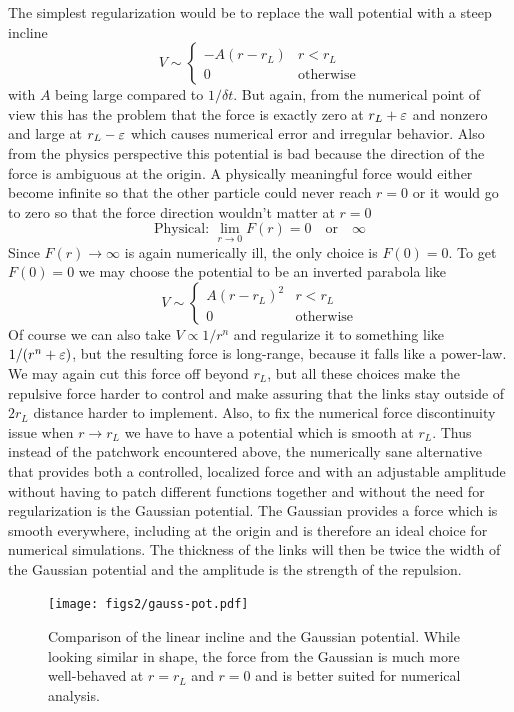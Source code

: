 \documentclass[nofootinbib,preprint,floatfix,titlepage,superscriptaddress]{revtex4} %
\begin{document}
The simplest regularization would be to replace the wall potential with a steep incline
\[V \sim \begin{cases} -A(r -r_L) & r< r_L \\
0 & \mbox{otherwise} 
\end{cases}\]
with $A$ being large compared to $1/\delta t$. 
But again, from the numerical point of view this has the problem that the force is exactly zero at $r_L+\varepsilon$ and nonzero and large at $r_L - \varepsilon$ which causes numerical error and irregular behavior. Also from the physics perspective this potential is bad because the direction of the force is ambiguous at the origin. A physically meaningful force would either become infinite so that the other particle could never reach $r=0$ or it would go to zero so that the force direction wouldn't matter at $r=0$
\[\mbox{Physical: } \lim_{r\to 0} F(r) = 0 \quad \mbox{or}\quad \infty \]
Since $F(r)\to \infty$ is again numerically ill, the only choice is $F(0) = 0$. To get $F(0) = 0$ we may choose the potential to be an inverted parabola like
\[V \sim \begin{cases} A(r -r_L)^2 & r< r_L \\
0 & \mbox{otherwise} 
\end{cases}\]
Of course we can also take $V\propto 1/r^n$ 
and regularize it to something like $1/(r^n+\varepsilon)$, but the resulting force is long-range, because it falls like a power-law. We may again cut this force off beyond $r_L$, but all these choices make the repulsive force harder to control and make assuring that the links stay outside of $2r_L$ distance harder to implement. 
Also, to fix the numerical force discontinuity issue when $r\to r_L$ we have to have a potential which is smooth at $r_L$. Thus instead of the patchwork encountered above, the numerically  sane 
alternative that provides both a controlled, localized force and with an adjustable amplitude without having to patch different functions together and without the need for regularization is the Gaussian potential. 
The Gaussian provides a force which is smooth everywhere, including at the origin and is therefore an ideal choice for numerical simulations. 
The thickness of the links will then be twice the width of the Gaussian potential and the amplitude is the strength of the repulsion.  

\begin{figure}
    \centering
    \texttt{[image: figs2/gauss-pot.pdf]}
    \caption{Comparison of the linear incline and the Gaussian potential. While looking similar in shape, the force from the Gaussian is much more well-behaved at $r= r_L$ and $r=0$ and is better suited for numerical analysis. }
    \label{fig:gauss}
\end{figure}
\end{document}
